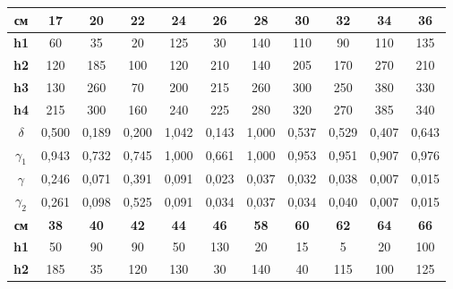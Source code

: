 \documentclass[a4paper, 12pt]{article}
\begin{document}
\begin{table}[H]
	\centering
	\begin{tabular}{|c|c|c|c|c|c|c|c|c|c|c|}
	\hline
	\textbf{см}         & \textbf{17} & \textbf{20} & \textbf{22} & \textbf{24} & \textbf{26} & \textbf{28} & \textbf{30} & \textbf{32} & \textbf{34} & \textbf{36} \\ \hline
	\textbf{h1}         & 60          & 35          & 20          & 125         & 30          & 140         & 110         & 90          & 110         & 135         \\ \hline
	\textbf{h2}         & 120         & 185         & 100         & 120         & 210         & 140         & 205         & 170         & 270         & 210         \\ \hline
	\textbf{h3}         & 130         & 260         & 70          & 200         & 215         & 260         & 300         & 250         & 380         & 330         \\ \hline
	\textbf{h4}         & 215         & 300         & 160         & 240         & 225         & 280         & 320         & 270         & 385         & 340         \\ \hline
	\textbf{$\delta$}   & 0,500       & 0,189       & 0,200       & 1,042       & 0,143       & 1,000       & 0,537       & 0,529       & 0,407       & 0,643       \\ \hline
	\textbf{$\gamma_1$} & 0,943       & 0,732       & 0,745       & 1,000       & 0,661       & 1,000       & 0,953       & 0,951       & 0,907       & 0,976       \\ \hline
	\textbf{$\gamma$}   & 0,246       & 0,071       & 0,391       & 0,091       & 0,023       & 0,037       & 0,032       & 0,038       & 0,007       & 0,015       \\ \hline
	\textbf{$\gamma_2$} & 0,261       & 0,098       & 0,525       & 0,091       & 0,034       & 0,037       & 0,034       & 0,040       & 0,007       & 0,015       \\ \hline
	\textbf{см}         & \textbf{38} & \textbf{40} & \textbf{42} & \textbf{44} & \textbf{46} & \textbf{58} & \textbf{60} & \textbf{62} & \textbf{64} & \textbf{66} \\ \hline
	\textbf{h1}         & 50          & 90          & 90          & 50          & 130         & 20          & 15          & 5           & 20          & 100         \\ \hline
	\textbf{h2}         & 185         & 35          & 120         & 130         & 30          & 140         & 40          & 115         & 100         & 125         \\ \hline

\end{tabular}
\end{table}
\end{document}
